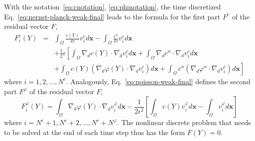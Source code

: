 With the notation~\eqref{eq:cnotation}, \eqref{eq:phinotation}, the time discretized 
Eq.~\eqref{eq:nernst-planck-weak-final} leads to the formula for the 
first part $F^c$ of the residual vector $F$,
\begin{eqnarray}
  F_i^c\left(Y\right) & = & \int_{\Omega} \frac{c(Y)}{\delta\tau}v_i^c d\mathbf{x} - 
  \int_{\Omega} \frac{c^{n}}{\delta\tau}v_i^c d\mathbf{x}\nonumber\\
  &&+\frac 12 \epsilon \left[\int_{\Omega} \nabla_d c(Y) \cdot \nabla_d v_i^c d\mathbf{x}+ 
  	\int_{\Omega} \nabla_d c^{n} \cdot \nabla_d v_i^c d\mathbf{x}\right.\nonumber\\
  &&+ \left.\int_{\Omega}c(Y) \left(\nabla_d \varphi(Y) \cdot \nabla_d v_i^c\right) d\mathbf{x}+
  \int_{\Omega}c^{n} \left(\nabla_d \varphi^{n} \cdot \nabla_d v_i^c\right) d\mathbf{x}\right]\label{eq:Fc}
\end{eqnarray}
where $i = 1, 2, \ldots, N^c$.
Analogously, Eq.~\eqref{eq:poisson-weak-final} defines the second part $F^{\varphi}$ 
of the residual vector $F$,
\begin{equation}
  F_i^{\varphi}\left(Y\right) = \int_{\Omega} \nabla_d \varphi(Y) \cdot \nabla_d v_i^{\varphi} d\mathbf{x} 
  -\frac{1}{2\epsilon^2}\left[ \int_{\Omega} c(Y)v_i^{\varphi} d\mathbf{x} -
   \int_{\Omega} v_i^{\varphi} d\mathbf{x}\right]
  \label{eq:Fphi}
\end{equation}
where $i = N^c + 1, N^c + 2, \ldots, N^c + N^{\varphi}$. The nonlinear discrete problem 
that needs to be solved at the end of each time step thus has the form 
$F(Y) = 0$.


